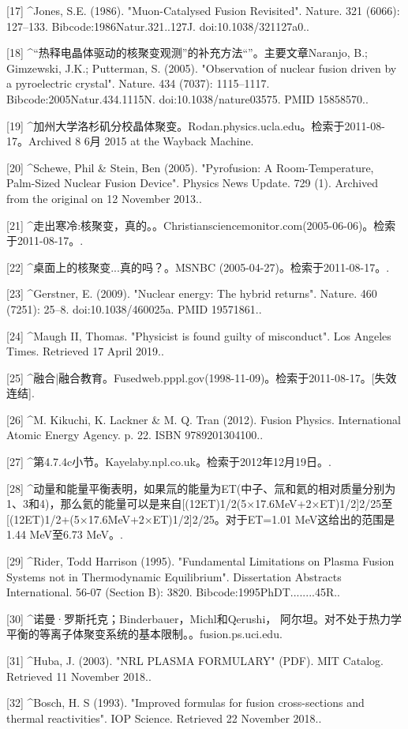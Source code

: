 [17]
^Jones, S.E. (1986). "Muon-Catalysed Fusion Revisited". Nature. 321 (6066): 127–133. Bibcode:1986Natur.321..127J. doi:10.1038/321127a0..

[18]
^“热释电晶体驱动的核聚变观测”的补充方法“”。主要文章Naranjo, B.; Gimzewski, J.K.; Putterman, S. (2005). "Observation of nuclear fusion driven by a pyroelectric crystal". Nature. 434 (7037): 1115–1117. Bibcode:2005Natur.434.1115N. doi:10.1038/nature03575. PMID 15858570..

[19]
^加州大学洛杉矶分校晶体聚变。Rodan.physics.ucla.edu。检索于2011-08-17。Archived 8 6月 2015 at the Wayback Machine.

[20]
^Schewe, Phil & Stein, Ben (2005). "Pyrofusion: A Room-Temperature, Palm-Sized Nuclear Fusion Device". Physics News Update. 729 (1). Archived from the original on 12 November 2013..

[21]
^走出寒冷:核聚变，真的。。Christiansciencemonitor.com(2005-06-06)。检索于2011-08-17。.

[22]
^桌面上的核聚变...真的吗？。MSNBC (2005-04-27)。检索于2011-08-17。.

[23]
^Gerstner, E. (2009). "Nuclear energy: The hybrid returns". Nature. 460 (7251): 25–8. doi:10.1038/460025a. PMID 19571861..

[24]
^Maugh II, Thomas. "Physicist is found guilty of misconduct". Los Angeles Times. Retrieved 17 April 2019..

[25]
^融合|融合教育。Fusedweb.pppl.gov(1998-11-09)。检索于2011-08-17。[失效连结].

[26]
^M. Kikuchi, K. Lackner & M. Q. Tran (2012). Fusion Physics. International Atomic Energy Agency. p. 22. ISBN 9789201304100..

[27]
^第4.7.4c小节。Kayelaby.npl.co.uk。检索于2012年12月19日。.

[28]
^动量和能量平衡表明，如果氚的能量为ET(中子、氚和氦的相对质量分别为1、3和4)，那么氦的能量可以是来自[(12ET)1/2(5×17.6MeV+2×ET)1/2]2/25至[(12ET)1/2+(5×17.6MeV+2×ET)1/2]2/25。对于ET=1.01 MeV这给出的范围是1.44 MeV至6.73 MeV。.

[29]
^Rider, Todd Harrison (1995). "Fundamental Limitations on Plasma Fusion Systems not in Thermodynamic Equilibrium". Dissertation Abstracts International. 56-07 (Section B): 3820. Bibcode:1995PhDT........45R..

[30]
^诺曼·罗斯托克；Binderbauer，Michl和Qerushi， 阿尔坦。对不处于热力学平衡的等离子体聚变系统的基本限制。。fusion.ps.uci.edu.

[31]
^Huba, J. (2003). "NRL PLASMA FORMULARY" (PDF). MIT Catalog. Retrieved 11 November 2018..

[32]
^Bosch, H. S (1993). "Improved formulas for fusion cross-sections and thermal reactivities". IOP Science. Retrieved 22 November 2018..